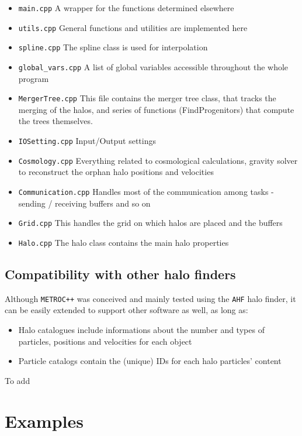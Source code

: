 \documentclass{article}
\begin{document}
\begin{itemize}
\item{\texttt{main.cpp}} A wrapper for the functions determined elsewhere
\item{\texttt{utils.cpp}} General functions and utilities are implemented here
\item{\texttt{spline.cpp}} The spline class is used for interpolation 
\item{\texttt{global\_vars.cpp}} A list of global variables accessible throughout the whole program
\item{\texttt{MergerTree.cpp}} This file contains the merger tree class, that tracks the merging of the halos, 
and series of functions (FindProgenitors) that compute the trees themselves.
\item{\texttt{IOSetting.cpp}} Input/Output settings
\item{\texttt{Cosmology.cpp}} Everything related to cosmological calculations, gravity solver to reconstruct the orphan halo 
positions and velocities 
\item{\texttt{Communication.cpp}} Handles most of the communication among tasks - sending / receiving buffers and so on
\item{\texttt{Grid.cpp}} This handles the grid on which halos are placed and the buffers
\item{\texttt{Halo.cpp}} The halo class contains the main halo properties
\end{itemize}

\subsection{Compatibility with other halo finders}

Although \texttt{METROC++} was conceived and mainly tested using the \texttt{AHF} halo finder, it can be easily extended to 
support other software as well, as long as:

\begin{itemize}
\item Halo catalogues include informations about the number and types of particles, positions and velocities for each object
\item Particle catalogs contain the (unique) IDs for each halo particles' content
\end{itemize}

To add 

\section{Examples}
\end{document}
